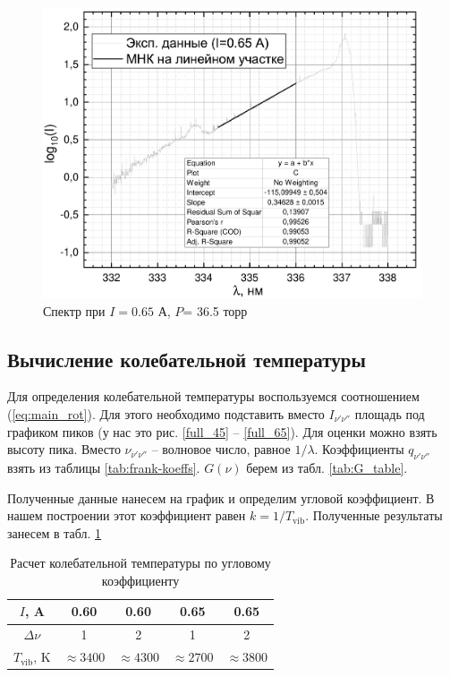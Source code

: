 \begin{figure}[h]
\begin{minipage}{0.45\linewidth}
		\includegraphics[width=\linewidth]{data/graph_I=0,65_polosa}
		\caption{Спектр при $I= 0.65 $ А, $P$= 36.5 торр}	
		\label{polosa_65}
	\end{minipage} 
	\hfill
\end{figure}

\subsection{Вычисление колебательной температуры}
Для определения колебательной температуры воспользуемся соотношением (\ref{eq:main_rot}). 
Для этого необходимо подставить вместо $I_{\nu' \nu''}$ площадь под графиком пиков (у нас это рис. \ref{full_45} -- \ref{full_65}). 
Для оценки можно взять высоту пика. 
Вместо $\nu_{\nu' \nu''}$ -- волновое число, равное $1/ \lambda$.
Коэффициенты $q_{\nu' \nu''}$ взять из таблицы \ref{tab:frank-koeffs}.
$G(\nu)$ берем из табл. \ref{tab:G_table}.

Полученные данные нанесем на график и определим угловой коэффициент. 
В нашем построении этот коэффициент равен $k = 1/T_\text{vib}$. 
Полученные результаты занесем в табл. \ref{tab:T_vib}

\begin{table}[h]
	\centering
	\caption{Расчет колебательной температуры по угловому коэффициенту}
	\begin{tabular}{|c||c|c|c|c|}
		\hline 
		$I$, A & 0.60 & 0.60 & 0.65 & 0.65 \\
		\hline
		$\Delta \nu$ & 1 & 2 & 1 & 2 \\
		\hline 
		$T_\text{vib}$, K & $\approx 3400$ & $\approx 4300$ & $\approx 2700$ & $\approx 3800$ \\
		\hline 
	\end{tabular} 
	\label{tab:T_vib}
\end{table}

